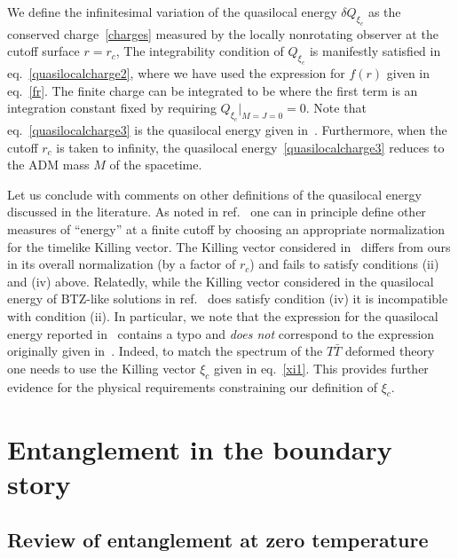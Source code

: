 \documentclass[11pt,a4paper,utf8]{article}
\begin{document}
	We define the infinitesimal variation of the quasilocal energy $\delta Q_{\xi_c}$ as the conserved charge~\eqref{charges} measured by the locally nonrotating observer at the cutoff surface $r = r_c$, 
	The integrability condition of $Q_{\xi_c}$ is manifestly satisfied in eq.~\eqref{quasilocalcharge2}, where we have used the expression for $f(r)$ given in eq.~\eqref{fr}. The finite charge can be integrated to be 
	where the first term is an integration constant fixed by requiring $Q_{\xi_c}\big |_{M=J=0}=0$.  Note that eq.~\eqref{quasilocalcharge3} is the quasilocal energy given in~\cite{McGough:2016lol}. Furthermore, when the cutoff $r_c$ is taken to infinity, the quasilocal energy~\eqref{quasilocalcharge3} reduces to the ADM mass $M$ of the spacetime. 
	 
	\noindent Let us conclude with comments on other definitions of the quasilocal energy discussed in the literature. As noted in ref.~\cite{Brown:1994gs} one can in principle define other measures of ``energy'' at a finite cutoff by choosing an appropriate normalization for the timelike Killing vector. The Killing vector considered in~\cite{Brown:1994gs} differs from ours in its overall normalization (by a factor of $r_c$) and fails to satisfy conditions (ii) and (iv) above. Relatedly, while the Killing vector considered in the quasilocal energy of BTZ-like solutions in ref.~\cite{Giribet:2013yka} does satisfy condition (iv) it is incompatible with condition (ii). In particular, we note that the expression for the quasilocal energy reported in~\cite{McGough:2016lol} contains a typo and \emph{does not} correspond to the expression originally given in~\cite{Brown:1994gs}. Indeed, to match the spectrum of the $T\bar{T}$ deformed theory one needs to use the Killing vector $\xi_c$ given in eq.~\eqref{xi1}. This provides further evidence for the physical requirements constraining our definition of $\xi_c$.  

\section{Entanglement in the boundary story}
\subsection{Review of entanglement at zero temperature}
\end{document}
